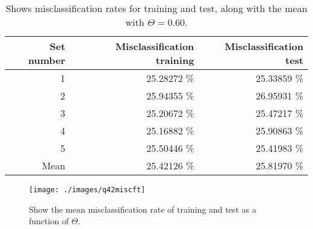 \begin{table}[!htbp]
\centering
\begin{tabular}{r r r}
Set number & Misclassification training & Misclassification test \\
\hline
1 & 25.28272 \% & 25.33859 \% \\
2 & 25.94355 \% & 26.95931 \% \\
3 & 25.20672 \% & 25.47217 \% \\
4 & 25.16882 \% & 25.90863 \% \\
5 & 25.50446 \% & 25.41983 \% \\
Mean & 25.42126 \% & 25.81970 \% \\
\end{tabular}
\caption{Shows misclassification rates for training and test, along with the mean with $\Theta = 0.60$.}
\label{tab:q42misctrtet60}
\end{table}

\begin{figure}
  \centering
  \texttt{[image: ./images/q42miscft]}
  \caption{Show the mean misclassification rate of training and test as a function of $\Theta$.}
  \label{fig:q42miscft}
\end{figure}
